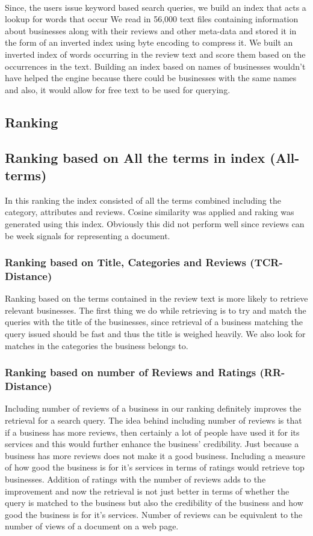 \documentclass[paper=letter, fontsize=15pt]{article} %
\begin{document}
\paragraph{}Since, the users issue keyword based search queries, we build an index that acts a lookup for words that occur  We read in 56,000 text files containing information about businesses along with their reviews and other meta-data and stored it in the form of an inverted index using byte encoding to compress it. We built an inverted index of words occurring in the review text and score them based on the occurrences in the text. Building an index based on names of businesses wouldn't have helped the engine because there could be businesses with the same names and also, it would allow for free text to be used for querying.

\subsection{Ranking}
\subsection{Ranking based on All the terms in index (All-terms)}
In this ranking the index consisted of all the terms combined including the category, attributes and reviews. Cosine similarity was applied and raking was generated using this index. Obviously this did not perform well since reviews can be week signals for representing a document.
\subsubsection{Ranking based on Title, Categories and Reviews (TCR-Distance)}
Ranking based on the terms contained in the review text is more likely to retrieve relevant businesses. The first thing we do while retrieving is to try and match the queries with the title of the businesses, since retrieval of a business matching the query issued should be fast and thus the title is weighed heavily. We also look for matches in the categories the business belongs to. 
\subsubsection{Ranking based on number of Reviews and Ratings (RR-Distance)}
Including number of reviews of a business in our ranking definitely improves the retrieval for a search query. The idea behind including number of reviews is that if a business has more reviews, then certainly a lot of people have used it for its services and this would further enhance the business' credibility. Just because a business has more reviews does not make it a good business. Including a measure of how good the business is for it's services in terms of ratings would retrieve top businesses. Addition of ratings with the number of reviews adds to the improvement and now the retrieval is not just better in terms of whether the query is matched to the business but also the credibility of the business and how good the business is for it's services. Number of reviews can be equivalent to the number of views of a document on a web page.
\end{document}
